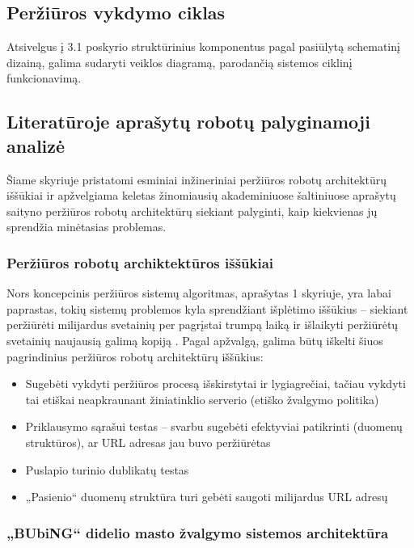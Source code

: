 \subsection{Peržiūros vykdymo ciklas}

Atsivelgus į 3.1 poskyrio struktūrinius komponentus pagal \cite{StanfWebCrawl} pasiūlytą schematinį dizainą, galima sudaryti veiklos diagramą, parodančią sistemos ciklinį funkcionavimą.



\subsection{Literatūroje aprašytų robotų palyginamoji analizė}

Šiame skyriuje pristatomi esminiai inžineriniai peržiūros robotų architektūrų iššūkiai ir apžvelgiama keletas žinomiausių akademiniuose šaltiniuose aprašytų saityno peržiūros robotų architektūrų siekiant palyginti, kaip kiekvienas jų sprendžia minėtasias problemas.

\subsubsection{Peržiūros robotų archiktektūros iššūkiai}

Nors koncepcinis peržiūros sistemų algoritmas, aprašytas 1 skyriuje, yra labai paprastas, tokių sistemų problemos kyla sprendžiant išplėtimo iššūkius -- siekiant peržiūrėti milijardus svetainių per pagrįstai trumpą laiką ir išlaikyti peržiūrėtų svetainių naujausią galimą kopiją \cite{WCArchitectureMicrosoft}. Pagal \cite{WCArchitectureMicrosoft} apžvalgą, galima būtų iškelti šiuos pagrindinius peržiūros robotų architektūrų iššūkius:

\begin{itemize}
  \item Sugebėti vykdyti peržiūros procesą išskirstytai ir lygiagrečiai, tačiau vykdyti tai etiškai neapkraunant žiniatinklio serverio (etiško žvalgymo politika)
  \item Priklausymo sąrašui testas -- svarbu sugebėti efektyviai patikrinti (duomenų struktūros), ar URL adresas jau buvo peržiūrėtas
  \item Puslapio turinio dublikatų testas
  \item „Pasienio“ duomenų struktūra turi gebėti saugoti milijardus URL adresų
\end{itemize}




\subsubsection{„BUbiNG“ didelio masto žvalgymo sistemos architektūra}